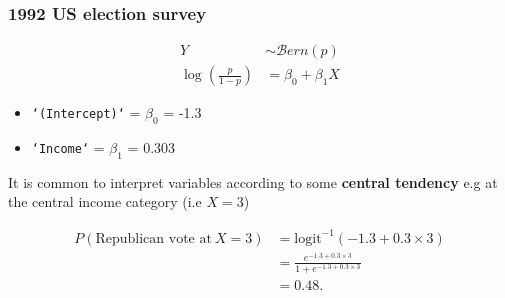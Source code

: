 \documentclass[pdf,handout]{beamer}
\begin{document}
\begin{frame}[fragile]
\frametitle{1992 US election survey}

$$
\begin{aligned}
Y  & \sim \mathcal{B}ern(p)\\
\log\left(\frac{p}{1 - p}\right) &  = \beta_0 + \beta_1 X
\end{aligned}
$$

\begin{itemize}
\item \texttt{`(Intercept)`} = $\beta_0$ = -1.3
\item \texttt{`Income`} = $\beta_1$ = 0.303
\end{itemize}

It is common to interpret variables according to some \textbf{central tendency} e.g at
the central income category (i.e $X=3$)

$$
\begin{aligned}
P(\mbox{Republican vote at}~X = 3) &= \mbox{logit}^{-1}\left(-1.3 + 0.3 \times 3\right)\\
&= \frac{e^{-1.3 + 0.3 \times 3}}{1 + e^{-1.3 + 0.3 \times 3}}\\
&= 0.48.
\end{aligned}
$$

\end{frame}


\end{document}
